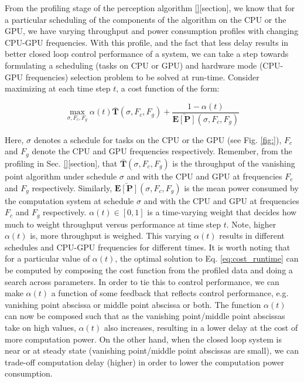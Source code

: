 
From the profiling stage of the perception algorithm \ref{}[section], we know that for a particular scheduling of the components of the algorithm on the CPU or the GPU, we have varying throughput and power consumption profiles with changing CPU-GPU frequencies. With this profile, and the fact that less delay results in better closed loop control performance of a system, we can take a step towards formulating a scheduling (tasks on CPU or GPU) and hardware mode (CPU-GPU frequencies) selection problem to be solved at run-time. Consider maximizing at each time step $t$, a cost function of the form:

\begin{equation}
\max_{\sigma,F_{c},F_{g}} \alpha(t)\mathbf{\bar{T}}(\sigma,F_{c},F_{g}) + \frac{1-\alpha(t)}{\mathbf{\bar{E[P]}}(\sigma,F_{c},F_{g})}
\label{eq:cost_runtime}
\end{equation}

Here, $\sigma$ denotes a schedule for tasks on the CPU or the GPU (see Fig. \ref{fig:}), $F_c$ and $F_g$ denote the CPU and GPU frequencies respectively. Remember, from the profiling in Sec. \ref{}[section], that $\mathbf{\bar{T}}(\sigma,F_{c},F_{g})$ is the throughput of the vanishing point algorithm under schedule $\sigma$ and with the CPU and GPU at frequencies $F_c$ and $F_g$ respectively. Similarly, $\mathbf{\bar{E[P]}}(\sigma,F_{c},F_{g})$ is the mean power consumed by the computation system at schedule $\sigma$ and with the CPU and GPU at frequencies $F_c$ and $F_g$ respectively. $\alpha(t) \in [0,1]$ is a time-varying weight that decides how much to weight throughput versus performance at time step $t$. Note, higher $\alpha(t)$ is, more throughput is weighed. This varying $\alpha(t)$ results in different schedules and CPU-GPU frequencies for different times. It is worth noting that for a particular value of $\alpha(t)$, the optimal solution to Eq. \ref{eq:cost_runtime} can be computed by composing the cost function from the profiled data and doing a search across parameters. In order to tie this to control performance, we can make $\alpha(t)$ a function of some feedback that reflects control performance, e.g. vanishing point abscissa or middle point abscissa or both. The function $\alpha(t)$ can now be composed such that as the vanishing point/middle point abscissas take on high values, $\alpha(t)$ also increases, resulting in a lower delay at the cost of more computation power. On the other hand, when the closed loop system is near or at steady state (vanishing point/middle point abscissas are small), we can trade-off computation delay (higher) in order to lower the computation power consumption. 